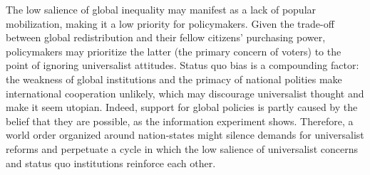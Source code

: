 \documentclass[12pt,english]{article}
\begin{document}
The low salience of global inequality may manifest as a lack of popular mobilization, making it a low priority for policymakers. Given the trade-off between global redistribution and their fellow citizens' purchasing power, policymakers may prioritize the latter (the primary concern of voters) to the point of ignoring universalist attitudes. 
Status quo bias is a compounding factor: the weakness of global institutions and the primacy of national polities make international cooperation unlikely, %
which may discourage universalist thought and make it seem utopian. %
Indeed, support for global policies is partly caused by the belief that they are possible, as the information experiment shows. Therefore, a %
world order organized around nation-states might silence demands for %
universalist reforms and perpetuate a cycle in which the low salience of universalist concerns and status quo institutions reinforce each other. 
\end{document}
